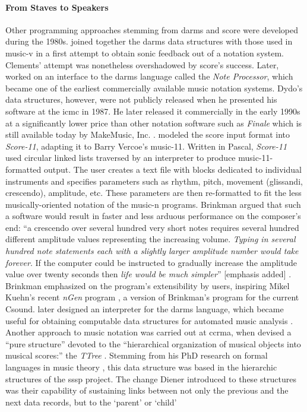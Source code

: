 \documentclass[
]{book}
\newcommand{\im}[0]{[emphasis added] }
\begin{document}
\paragraph{From Staves to Speakers}
Other programming approaches stemming from \gls{darms} and \gls{score} were developed during the 1980s. \textcite{icmc/bbp2372.1980.020} joined together the \gls{darms} data structures with those used in \gls{music-v} in a first attempt to obtain sonic feedback out of a notation system. Clements' attempt was nonetheless overshadowed by \gls{score}'s success. Later, \textcite{icmc/bbp2372.1987.045} worked on an interface to the \gls{darms} language called the \textit{Note Processor}, which became one of the earliest commercially available music notation systems. Dydo's data structures, however, were not publicly released when he presented his software at the \gls{icmc} in 1987. He later released it commercially in the early 1990s at a significantly lower price than other notation software such as \textit{Finale} which is still available today by MakeMusic, Inc. \parencites{10.2307/941442}{10.2307/940555}. \textcite{icmc/bbp2372.1981.018} modeled the \gls{score} input format into \textit{Score-11}, adapting it to Barry Vercoe's \gls{music-11}. Written in Pascal, \textit{Score-11} used circular linked lists traversed by an interpreter to produce \gls{music-11}-formatted output. The user creates a text file with blocks dedicated to individual instruments and specifies parameters such as rhythm, pitch, movement (glissandi, crescendo), amplitude, etc. These parameters are then re-formatted to fit the less musically-oriented notation of the \gls{music-n} programs. Brinkman argued that such a software would result in faster and less arduous performance on the composer's end: ``a crescendo over several hundred very short notes requires several hundred different amplitude values representing the increasing volume. \textit{Typing in several hundred note statements each with a slightly larger amplitude number would take forever}. If the computer could be instructed to gradually increase the amplitude value over twenty seconds then \textit{life would be much simpler}'' \im \parencite{score11manual}. Brinkman emphasized on the program's extensibility by users, inspiring Mikel Kuehn's recent \textit{nGen} program \parencite{csoundMethods}, a version of Brinkman's program for the current Csound. \textcite{icmc/bbp2372.1983.002} later designed an interpreter for the \gls{darms} language, which became useful for obtaining computable data structures for automated music analysis \parencite{icmc/bbp2372.1984.033}. Another approach to music notation was carried out at \gls{ccrma}, when \textcites{icmc/bbp2372.1988.020}{10.2307/3680043} devised a ``pure structure'' devoted to the ``hierarchical organization of musical objects into musical scores:'' the \textit{TTree} \parencite[184]{icmc/bbp2372.1988.020}. Stemming from his PhD research on formal languages in music theory \parencite{diener1985}, this data structure was based in the hierarchic structures of the \gls{sssp} project. The change Diener introduced to these structures was their capability of sustaining links between not only the previous and the next data records, but to the `parent' or `child' 
\end{document}
